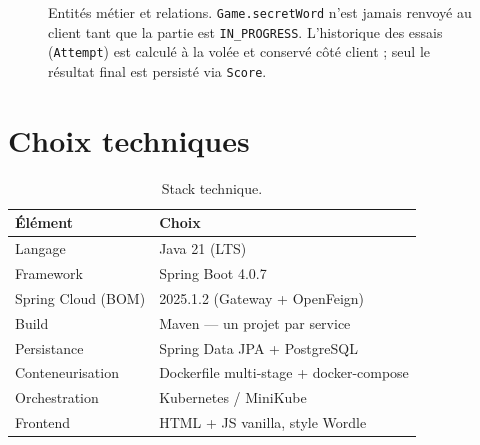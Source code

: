 \documentclass[11pt,a4paper]{article}
\begin{document}
\begin{figure}[h]
\caption{Entités métier et relations. \texttt{Game.secretWord} n'est jamais renvoyé au
client tant que la partie est \texttt{IN\_PROGRESS}. L'historique des essais (\texttt{Attempt})
est calculé à la volée et conservé côté client ; seul le résultat final est persisté via \texttt{Score}.}
\end{figure}

\section{Choix techniques}
\begin{table}[h]
\centering
\small
\begin{tabular}{@{}ll@{}}
\toprule
\textbf{Élément} & \textbf{Choix} \\
\midrule
Langage           & Java 21 (LTS) \\
Framework         & Spring Boot 4.0.7 \\
Spring Cloud (BOM) & 2025.1.2 (Gateway + OpenFeign) \\
Build             & Maven — un projet par service \\
Persistance       & Spring Data JPA + PostgreSQL \\
Conteneurisation  & Dockerfile multi-stage + docker-compose \\
Orchestration     & Kubernetes / MiniKube \\
Frontend          & HTML + JS vanilla, style Wordle \\
\bottomrule
\end{tabular}
\caption{Stack technique.}
\end{table}
\end{document}
